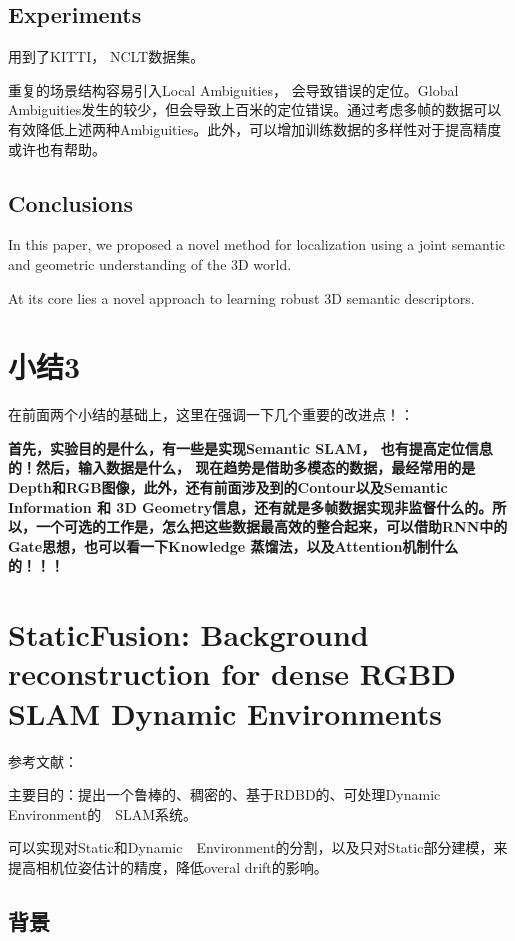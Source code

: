 \subsection{Experiments}

用到了KITTI， NCLT数据集。

重复的场景结构容易引入Local Ambiguities， 会导致错误的定位。Global Ambiguities发生的较少，但会导致上百米的定位错误。通过考虑多帧的数据可以有效降低上述两种Ambiguities。此外，可以增加训练数据的多样性对于提高精度或许也有帮助。

\subsection{Conclusions}

In this paper, we proposed a novel method for localization using a joint semantic and geometric  understanding of the 3D world.

At its core lies a novel approach to learning robust 3D semantic descriptors. 

\section{小结3}

在前面两个小结的基础上，这里在强调一下几个重要的改进点！：

{\color{red} \bfseries 首先，实验目的是什么，有一些是实现Semantic SLAM， 也有提高定位信息的！然后，输入数据是什么， 现在趋势是借助多模态的数据，最经常用的是 Depth和RGB图像，此外，还有前面涉及到的Contour以及Semantic Information 和 3D Geometry信息，还有就是多帧数据实现非监督什么的。所以，一个可选的工作是，怎么把这些数据最高效的整合起来，可以借助RNN中的Gate思想，也可以看一下Knowledge 蒸馏法，以及Attention机制什么的！！！}

\section[StaticFusion]{StaticFusion: Background reconstruction for dense RGBD SLAM Dynamic Environments}

参考文献：\cite{scona2018staticfusion}

主要目的：提出一个鲁棒的、稠密的、基于RDBD的、可处理Dynamic Environment的　SLAM系统。

可以实现对Static和Dynamic　Environment的分割，以及只对Static部分建模，来提高相机位姿估计的精度，降低overal drift的影响。

\subsection{背景}

